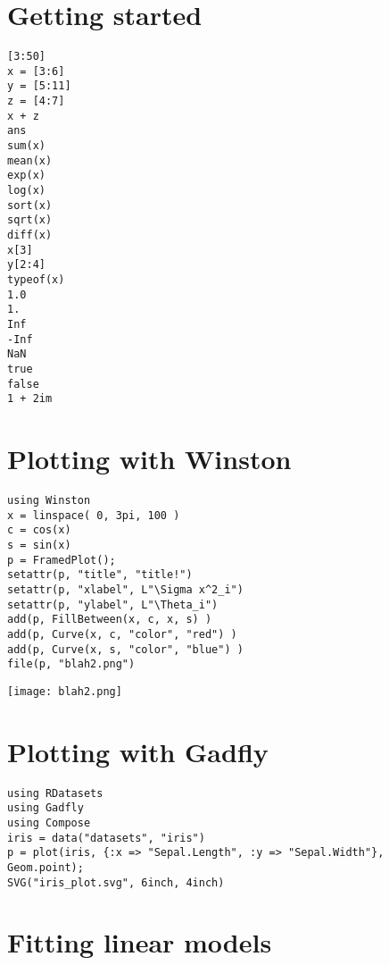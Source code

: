 \documentclass[11pt]{article}
\begin{document}
\section[Getting started]{Getting started}
\label{sec-2}

\begin{verbatim}
[3:50]
x = [3:6]
y = [5:11]
z = [4:7]
x + z
ans
sum(x)
mean(x)
exp(x)
log(x)
sort(x)
sqrt(x)
diff(x)
x[3]
y[2:4]
typeof(x)
1.0
1.
Inf
-Inf
NaN
true
false
1 + 2im
\end{verbatim}
\section[Plotting with Winston]{Plotting with Winston}
\label{sec-3}

\begin{verbatim}
using Winston
x = linspace( 0, 3pi, 100 )
c = cos(x)
s = sin(x)
p = FramedPlot();
setattr(p, "title", "title!")
setattr(p, "xlabel", L"\Sigma x^2_i")
setattr(p, "ylabel", L"\Theta_i")
add(p, FillBetween(x, c, x, s) )
add(p, Curve(x, c, "color", "red") )
add(p, Curve(x, s, "color", "blue") )
file(p, "blah2.png")
\end{verbatim}

\texttt{[image: blah2.png]}
\section[Plotting with Gadfly]{Plotting with Gadfly}
\label{sec-4}

\begin{verbatim}
using RDatasets
using Gadfly
using Compose
iris = data("datasets", "iris")
p = plot(iris, {:x => "Sepal.Length", :y => "Sepal.Width"}, Geom.point);
SVG("iris_plot.svg", 6inch, 4inch)
\end{verbatim}

\section[Fitting linear models]{Fitting linear models}
\label{sec-5}
\end{document}
